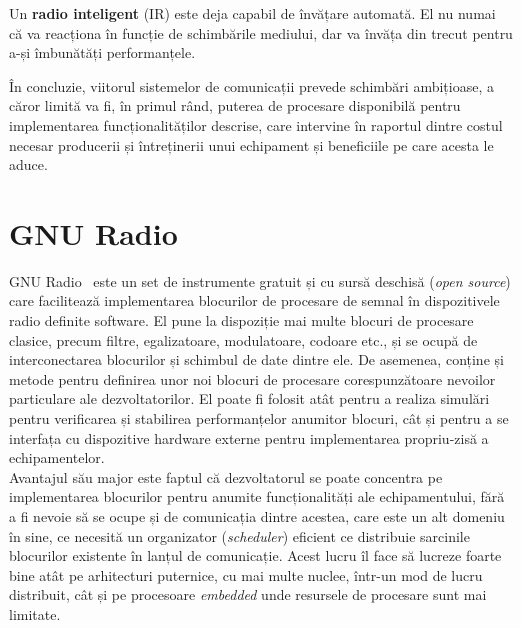 Un \textbf{radio inteligent} (IR) este deja capabil de învățare automată. El nu numai
că va reacționa în funcție de schimbările mediului, dar va învăța din trecut
pentru a-și îmbunătăți performanțele. \\ 

În concluzie, viitorul sistemelor de comunicații prevede schimbări ambițioase, a
căror limită va fi, în primul rând, puterea de procesare disponibilă pentru
implementarea funcționalităților descrise, care intervine în raportul dintre
costul necesar producerii și întreținerii unui echipament și beneficiile pe care
acesta le aduce. 


\section{GNU Radio}
\label{sec:gnuradio}

GNU Radio~\cite{gnuradio} este un set de instrumente gratuit și cu sursă deschisă
(\textit{open source}) care facilitează implementarea blocurilor de procesare de
semnal în dispozitivele radio definite software. El pune la dispoziție mai multe
blocuri de procesare clasice, precum filtre, egalizatoare, modulatoare, codoare
etc., și se ocupă de interconectarea blocurilor și schimbul de date dintre ele.
De asemenea, conține și metode pentru definirea unor noi blocuri de procesare
corespunzătoare nevoilor particulare ale dezvoltatorilor. El poate fi folosit
atât pentru a realiza simulări pentru verificarea și stabilirea performanțelor
anumitor blocuri, cât și pentru a se interfața cu dispozitive hardware externe
pentru implementarea propriu-zisă a echipamentelor. \\

Avantajul său major este faptul că dezvoltatorul se poate concentra pe
implementarea blocurilor pentru anumite funcționalități ale echipamentului, fără
a fi nevoie să se ocupe și de comunicația dintre acestea, care este un alt
domeniu în sine, ce necesită un organizator (\textit{scheduler}) eficient ce distribuie
sarcinile blocurilor existente în lanțul de comunicație.  Acest lucru îl face să
lucreze foarte bine atât pe arhitecturi puternice, cu mai multe nuclee, într-un
mod de lucru distribuit, cât și pe procesoare \textit{embedded} unde resursele
de procesare sunt mai limitate. \\


